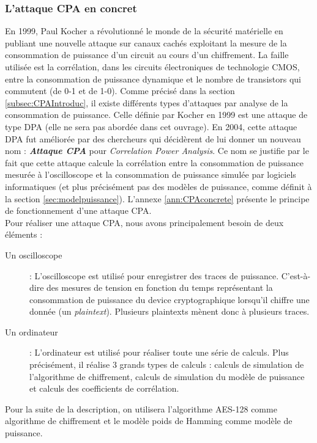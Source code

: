 \documentclass[10pt, oneside, a4paper]{article}
\begin{document}
\subsubsection{L'attaque CPA en concret}
\label{sec:CPAEntire}
En 1999, Paul Kocher a révolutionné le monde de la sécurité matérielle en publiant une nouvelle attaque sur canaux cachés exploitant la mesure de la consommation de puissance d’un circuit au cours d’un chiffrement. La faille utilisée est la corrélation, dans les circuits électroniques de technologie CMOS, entre la consommation de puissance dynamique et le nombre de transistors qui commutent (de 0-1 et de 1-0). Comme précisé dans la section \ref{subsec:CPAIntroduc}, il existe différents types d'attaques par analyse de la consommation de puissance. Celle définie par Kocher en 1999 est une attaque de type DPA (elle ne sera pas abordée dans cet ouvrage). En 2004, cette attaque DPA fut améliorée par des chercheurs qui décidèrent de lui donner un nouveau nom : \textbf{\textit{Attaque CPA}} pour \textit{Correlation Power Analysis}. Ce nom se justifie par le fait que cette attaque calcule la corrélation entre la consommation de puissance mesurée à l'oscilloscope et la consommation de puissance simulée par logiciels informatiques (et plus précisément pas des modèles de puissance, comme définit à la section \ref{sec:modelpuissance}). L'annexe \ref{ann:CPAconcrete} présente le principe de fonctionnement d'une attaque CPA.\vspace{0.25 cm} \\
\hspace{-0.5 cm}Pour réaliser une attaque CPA, nous avons  principalement besoin de deux éléments :
\begin{description}
\item[Un oscilloscope] : L'oscilloscope est utilisé pour enregistrer des traces de puissance. C'est-à-dire des mesures de tension en fonction du temps représentant la consommation de puissance du device cryptographique lorsqu'il chiffre une donnée (un \textit{plaintext}). Plusieurs plaintexts mènent donc à plusieurs traces.
\item[Un ordinateur] : L'ordinateur est utilisé pour réaliser toute une série de calculs. Plus précisément, il réalise 3 grands types de calculs : calculs de simulation de l'algorithme de chiffrement, calculs de simulation du modèle de puissance et calculs des coefficients de corrélation.
\end{description}
Pour la suite de la description, on utilisera l'algorithme AES-128 comme algorithme de chiffrement et le modèle poids de Hamming comme modèle de puissance.
\end{document}
